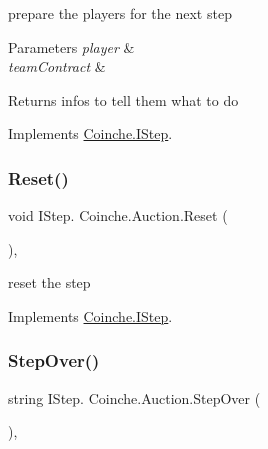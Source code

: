 prepare the players for the next step 


\begin{DoxyParams}{Parameters}
{\em player} & \\
\hline
{\em team\+Contract} & \\
\hline
\end{DoxyParams}
\begin{DoxyReturn}{Returns}
infos to tell them what to do
\end{DoxyReturn}


Implements \hyperlink{interface_coinche_1_1_i_step_ada17a0e471c5afbc7e4f4acc434cdd76}{Coinche.\+I\+Step}.

\mbox{\label{class_coinche_1_1_auction_ae6b090721adfc333705f5f79ca9b462a}} 
\subsubsection{\texorpdfstring{Reset()}{Reset()}}
{\footnotesize\ttfamily void I\+Step. Coinche.\+Auction.\+Reset (\begin{DoxyParamCaption}{ }\end{DoxyParamCaption})\hspace{0.3cm}{\ttfamily [inline]}, {\ttfamily [private]}}



reset the step 



Implements \hyperlink{interface_coinche_1_1_i_step_a764f20494a35e9b006c6495a38717e9a}{Coinche.\+I\+Step}.

\mbox{\label{class_coinche_1_1_auction_ab1621fd742e17a9814671116d4d0682c}} 
\subsubsection{\texorpdfstring{Step\+Over()}{StepOver()}}
{\footnotesize\ttfamily string I\+Step. Coinche.\+Auction.\+Step\+Over (\begin{DoxyParamCaption}{ }\end{DoxyParamCaption})\hspace{0.3cm}{\ttfamily [inline]}, {\ttfamily [private]}}



